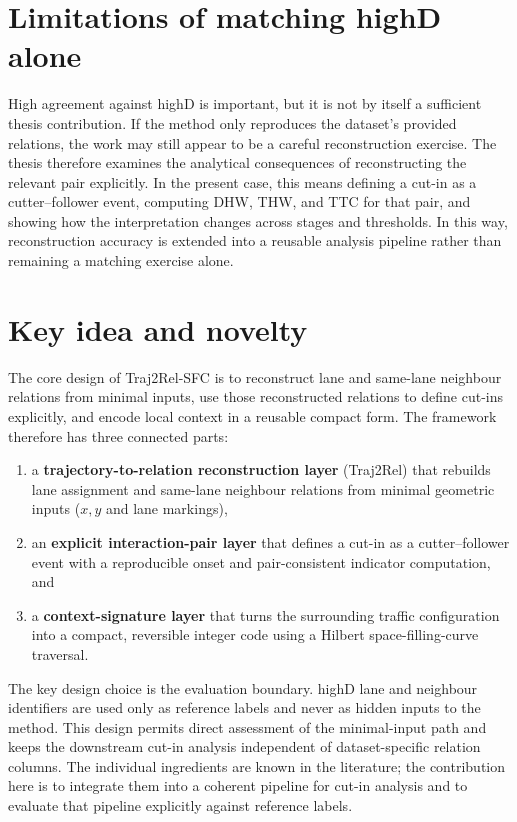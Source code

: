 \documentclass[12pt,a4paper,twoside,openright]{report}
\newcommand{\FrameworkName}{Traj2Rel-SFC}
\begin{document}
    \section{Limitations of matching highD alone}
    High agreement against highD is important, but it is not by itself a sufficient thesis contribution. If the method only reproduces the dataset's provided relations, the work may still appear to be a careful reconstruction exercise. The thesis therefore examines the analytical consequences of reconstructing the relevant pair explicitly. In the present case, this means defining a cut-in as a cutter--follower event, computing DHW, THW, and TTC for that pair, and showing how the interpretation changes across stages and thresholds. In this way, reconstruction accuracy is extended into a reusable analysis pipeline rather than remaining a matching exercise alone.

    \section{Key idea and novelty}
    The core design of \FrameworkName{} is to reconstruct lane and same-lane neighbour relations from minimal inputs, use those reconstructed relations to define cut-ins explicitly, and encode local context in a reusable compact form. The framework therefore has three connected parts:

    \begin{enumerate}[leftmargin=1.6em]
  \item a \textbf{trajectory-to-relation reconstruction layer} (Traj2Rel) that rebuilds lane assignment and same-lane neighbour relations from minimal geometric inputs ($x,y$ and lane markings),
  \item an \textbf{explicit interaction-pair layer} that defines a cut-in as a cutter--follower event with a reproducible onset and pair-consistent indicator computation, and
  \item a \textbf{context-signature layer} that turns the surrounding traffic configuration into a compact, reversible integer code using a Hilbert space-filling-curve traversal.
    \end{enumerate}

    The key design choice is the evaluation boundary. highD lane and neighbour identifiers are used only as reference labels and never as hidden inputs to the method. This design permits direct assessment of the minimal-input path and keeps the downstream cut-in analysis independent of dataset-specific relation columns. The individual ingredients are known in the literature; the contribution here is to integrate them into a coherent pipeline for cut-in analysis and to evaluate that pipeline explicitly against reference labels.
\end{document}
